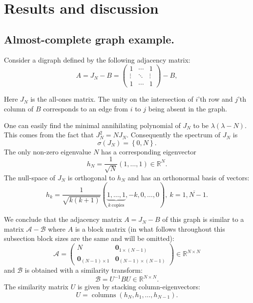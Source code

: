 \documentclass[a4paper]{jpconf}
\begin{document}
\section{Results and discussion}

\subsection*{Almost-complete graph example.}

Consider a digraph defined by the following adjacency matrix:
\[
    A = J_N - B = \begin{pmatrix}1 & \cdots & 1 \\ \vdots & \ddots & \vdots \\ 1 & \cdots & 1\end{pmatrix} - B,
\]

Here \( J_N \) is the all-ones matrix.
The unity on the intersection
of \( i \)'th row and \( j \)'th column of \( B \)
corresponds to an edge from \( i \) to \( j \)
being absent in the graph.

One can easily find the minimal annihilating polynomial of \( J_N \)
    to be \( \lambda(\lambda - N) \).
This comes from the fact that \( J_N^2 = N J_N \).
Consequently the spectrum of \( J_N \) is
\[
    \sigma(J_N) = \left\{0, N\right\}.
\]
The only non-zero eigenvalue \( N \) has a corresponding eigenvector
\[
    h_N = \frac{1}{\sqrt{N}} \left(1, \ldots, 1\right)\in\mathbb{R}^N.
\]
The null-space of \( J_N \) is orthogonal to \( h_N \)
    and has an orthonormal basis of vectors:
\[
    h_k = \frac{1}{\sqrt{k(k+1)}} \left(\underbrace{1, \ldots, 1}_{k\ \text{copies}}, -k, 0, \ldots, 0\right),\ k=\overline{1, N-1}.
\]

We conclude that the adjacency matrix \( A = J_N - B \) of this graph
    is similar to a matrix \( \mathcal{A} - \mathcal{B} \)
    where \( A \) is a block matrix (in what follows throughout this subsection block sizes are the same and will be omitted):
    \[
        \mathcal{A} = \left(\begin{array}{c|c}
        N & \mathbf{0}_{1{\times}(N{-}1)} \\ \hline
            \mathbf{0}_{(N{-}1){\times}1} & \mathbf{0}_{(N{-}1){\times}(N{-}1)}
        \end{array}\right) \in \mathbb{R}^{N{\times}N}
    \]
    and \( \mathcal{B} \) is obtained with a similarity transform:
    \[
        \mathcal{B} = U^{-1} B U \in \mathbb{R}^{N{\times}N}.
    \]
The similarity matrix \( U \) is given by stacking column-eigenvectors:
    \[
        U = \operatorname{columns}(h_N, h_1, \ldots, h_{N-1}).
    \]
\end{document}

